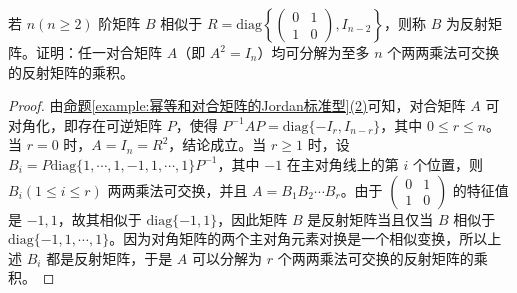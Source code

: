 \documentclass[../../main.tex]{subfiles}%
\begin{document}
\begin{example}
若 $n(n\geqslant  2)$ 阶矩阵 $B$ 相似于 $R = \mathrm{diag}\left\{\begin{pmatrix}0 & 1 \\ 1 & 0\end{pmatrix},I_{n - 2}\right\}$，则称 $B$ 为反射矩阵。证明：任一对合矩阵 $A$（即 $A^2 = I_n$）均可分解为至多 $n$ 个两两乘法可交换的反射矩阵的乘积。
\end{example}
\begin{proof}

由\hyperref[example:幂等和对合矩阵的Jordan标准型]{命题\ref{example:幂等和对合矩阵的Jordan标准型}(2)}可知，对合矩阵 $A$ 可对角化，即存在可逆矩阵 $P$，使得 $P^{-1}AP=\mathrm{diag}\{-I_r,I_{n - r}\}$，其中 $0\leqslant  r\leqslant  n$。当 $r = 0$ 时，$A = I_n = R^2$，结论成立。当 $r\geqslant  1$ 时，设 $B_i = P\mathrm{diag}\{1,\cdots,1,-1,1,\cdots,1\}P^{-1}$，其中 $-1$ 在主对角线上的第 $i$ 个位置，则 $B_i(1\leqslant  i\leqslant  r)$ 两两乘法可交换，并且 $A = B_1B_2\cdots B_r$。由于 $\begin{pmatrix}0 & 1 \\ 1 & 0\end{pmatrix}$ 的特征值是 $-1,1$，故其相似于 $\mathrm{diag}\{-1,1\}$，因此矩阵 $B$ 是反射矩阵当且仅当 $B$ 相似于 $\mathrm{diag}\{-1,1,\cdots,1\}$。因为对角矩阵的两个主对角元素对换是一个相似变换，所以上述 $B_i$ 都是反射矩阵，于是 $A$ 可以分解为 $r$ 个两两乘法可交换的反射矩阵的乘积。

\end{proof}
\end{document}
